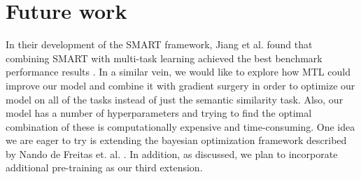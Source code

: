 \documentclass{article}
\begin{document}
\section{Future work}
    In their development of the SMART framework, Jiang et al. found that combining SMART with multi-task learning achieved the best benchmark performance results \cite{smart}. In a similar vein, we would like to explore how MTL could improve our model and combine it with gradient surgery in order to optimize our model on  all of the tasks instead of just the semantic similarity task. Also, our model has a number of hyperparameters and trying to find the optimal combination of these is computationally expensive and time-consuming. One idea we are eager to try is extending the bayesian optimization framework described by Nando de Freitas et. al. \cite{BayesianOpt}. In addition, as discussed, we plan to incorporate additional pre-training as our third extension.

\newpage


\end{document}
